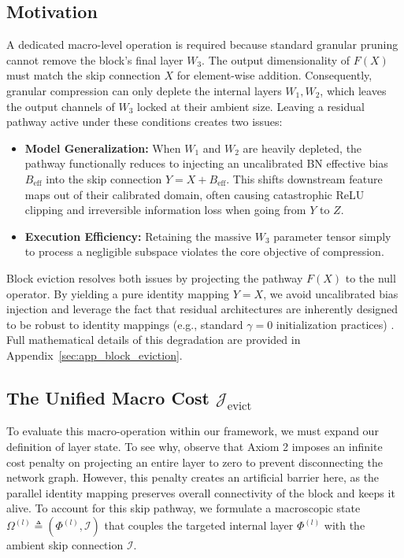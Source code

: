 \documentclass[11pt, a4paper, copyright, gdm]{google}
\newcommand{\calI}{\mathcal{I}}
\newcommand{\calJ}{\mathcal{J}}
\theoremstyle{definition}
\begin{document}
\subsection{Motivation}
A dedicated macro-level operation is required because standard granular pruning cannot remove the block's final layer $W_3$. The output dimensionality of $F(X)$ must match the skip connection $X$ for element-wise addition. Consequently, granular compression can only deplete the internal layers $W_1,W_2$, which leaves the output channels of $W_3$ locked at their ambient size. Leaving a residual pathway active under these conditions creates two issues:
\begin{itemize}
    \item \textbf{Model Generalization:} When $W_1$ and $W_2$ are heavily depleted, the pathway functionally reduces to injecting an uncalibrated BN effective bias $B_{\text{eff}}$ into the skip connection $Y = X + B_{\text{eff}}$. This shifts downstream feature maps out of their calibrated domain, often causing catastrophic ReLU clipping and irreversible information loss when going from $Y$ to $Z$.
    \item \textbf{Execution Efficiency:} Retaining the massive $W_3$ parameter tensor simply to process a negligible subspace violates the core objective of compression.
\end{itemize}
Block eviction resolves both issues by projecting the pathway $F(X)$ to the null operator. By yielding a pure identity mapping $Y = X$, we avoid uncalibrated bias injection and leverage the fact that residual architectures are inherently designed to be robust to identity mappings (e.g., standard $\gamma=0$ initialization practices) \cite{goyal2017accurate, he2016identity}. Full mathematical details of this degradation are provided in Appendix~\ref{sec:app_block_eviction}.

\subsection{The Unified Macro Cost $\calJ_{\text{evict}}$}
To evaluate this macro-operation within our framework, we must expand our definition of layer state. To see why, observe that Axiom 2 imposes an infinite cost penalty on projecting an entire layer to zero to prevent disconnecting the network graph. However, this penalty creates an artificial barrier here, as the parallel identity mapping preserves overall connectivity of the block and keeps it alive. To account for this skip pathway, we formulate a macroscopic state $\Omega^{(l)} \triangleq (\Phi^{(l)}, \calI)$ that couples the targeted internal layer $\Phi^{(l)}$ with the ambient skip connection $\calI$.
\end{document}
